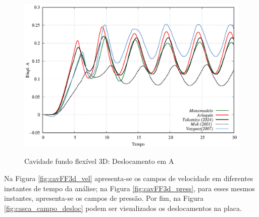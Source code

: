\begin{figure}[!htbp]
	\caption{Cavidade fundo flexível 3D: Deslocamento em A}
	\centering 
	\includegraphics[scale=1.0,trim=0cm 0cm 0cm 0cm, clip=true]{Imagens/Cap7/cavFF3d_deslA.eps}	
	\label{fig:cavFF3d_deslA}
\end{figure}

Na Figura \ref{fig:cavFF3d_vel} apresenta-se os campos de velocidade em diferentes instantes de tempo da análise; na Figura \ref{fig:cavFF3d_press}, para esses mesmos instantes, apresenta-se os campos de pressão. Por fim, na Figura \ref{fig:casca_campo_desloc} podem ser visualizados os deslocamentos na placa.


